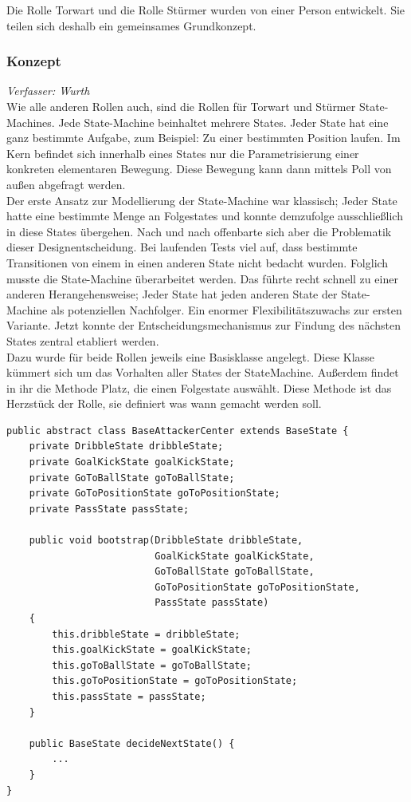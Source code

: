 \documentclass[fontsize=12pt,a4paper,final]{scrartcl}[2003/01/01]
\begin{document}
Die Rolle Torwart und die Rolle Stürmer wurden von einer Person entwickelt. Sie teilen sich deshalb ein gemeinsames Grundkonzept.

\subsubsection{Konzept}
\textit{Verfasser: Wurth}\\

Wie alle anderen Rollen auch, sind die Rollen für Torwart und Stürmer State-Machines. Jede State-Machine beinhaltet mehrere States. Jeder State hat eine ganz bestimmte Aufgabe, zum Beispiel: Zu einer bestimmten Position laufen. Im Kern befindet sich innerhalb eines States nur die Parametrisierung einer konkreten elementaren Bewegung. Diese Bewegung kann dann mittels Poll von außen abgefragt werden.
\\

Der erste Ansatz zur Modellierung der State-Machine war klassisch; Jeder State hatte eine bestimmte Menge an Folgestates und konnte demzufolge ausschließlich in diese States übergehen. Nach und nach offenbarte sich aber die Problematik dieser Designentscheidung. Bei laufenden Tests viel auf, dass bestimmte Transitionen von einem in einen anderen State nicht bedacht wurden. Folglich musste die State-Machine überarbeitet werden. Das führte recht schnell zu einer anderen Herangehensweise; Jeder State hat jeden anderen State der State-Machine als potenziellen Nachfolger. Ein enormer Flexibilitätszuwachs zur ersten Variante. Jetzt konnte der Entscheidungsmechanismus zur Findung des nächsten States  zentral etabliert werden. 
\\

Dazu wurde für beide Rollen jeweils eine Basisklasse angelegt. Diese Klasse kümmert sich um das Vorhalten aller States der StateMachine. Außerdem findet in ihr die Methode Platz, die einen Folgestate auswählt. Diese Methode ist das Herzstück der Rolle, sie definiert was wann gemacht werden soll.
\\

\begin{lstlisting}[caption=Beispiel Basisklasse Stürmer, captionpos=b, label=Beispiel Basisklasse Stürmer]
public abstract class BaseAttackerCenter extends BaseState {
    private DribbleState dribbleState;
    private GoalKickState goalKickState;
    private GoToBallState goToBallState;
    private GoToPositionState goToPositionState;
    private PassState passState;

    public void bootstrap(DribbleState dribbleState, 
    					  GoalKickState goalKickState, 
    					  GoToBallState goToBallState, 
                          GoToPositionState goToPositionState, 
                          PassState passState) 
    {
        this.dribbleState = dribbleState;
        this.goalKickState = goalKickState;
        this.goToBallState = goToBallState;
        this.goToPositionState = goToPositionState;
        this.passState = passState;
    }

    public BaseState decideNextState() {
        ...
    }
}
\end{lstlisting}
\end{document}
